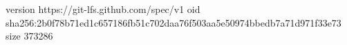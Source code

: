 version https://git-lfs.github.com/spec/v1
oid sha256:2b0f78b71ed1c657186fb51c702daa76f503aa5e50974bbedb7a71d971f33e73
size 373286
